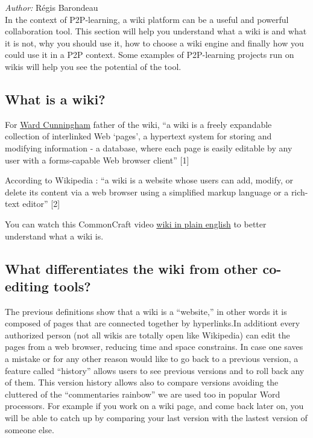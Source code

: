 \emph{Author:} Régis Barondeau \\

In the context of P2P-learning, a wiki platform can be a useful and
powerful collaboration tool. This section will help you understand what
a wiki is and what it is not, why you should use it, how to choose a
wiki engine and finally how you could use it in a P2P context. Some
examples of P2P-learning projects run on wikis will help you see the
potential of the tool.

\subsection{What is a wiki?}

For \href{http://en.wikipedia.org/wiki/Ward\_cunningham}{Ward
Cunningham} father of the wiki, ``a wiki is a freely expandable
collection of interlinked Web `pages', a hypertext system for storing
and modifying information - a database, where each page is easily
editable by any user with a forms-capable Web browser client'' {[}1{]}

According to Wikipedia : ``a wiki is a website whose users can add,
modify, or delete its content via a web browser using a simplified
markup language or a rich-text editor'' {[}2{]}

You can watch this CommonCraft video
\href{http://www.youtube.com/watch?v=-dnL00TdmLY}{wiki in plain english}
to better understand what a wiki is.

\subsection{What differentiates the wiki from other co-editing tools?}

The previous definitions show that a wiki is a ``website,'' in other
words it is composed of pages that are connected together by
hyperlinks.In additiont every authorized person (not all wikis are
totally open like Wikipedia) can edit the pages from a web browser,
reducing time and space constrains. In case one saves a mistake or for
any other reason would like to go back to a previous version, a feature
called ``history'' allows users to see previous versions and to roll
back any of them. This version history allows also to compare versions
avoiding the cluttered of the ``commentaries rainbow'' we are used too
in popular Word processors. For example if you work on a wiki page, and
come back later on, you will be able to catch up by comparing your last
version with the lastest version of someone else.


